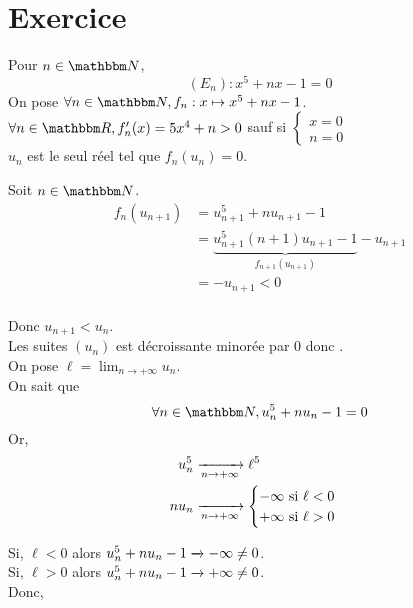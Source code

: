 \part{Exercice}
Pour $n \in \N$, \[
	(E_n): x^{5} + nx - 1 = 0
\] 
On pose $\forall n \in \N, f_n: x \mapsto x^{5} + nx - 1$.\\
$\forall n \in \R, f'_n(x) = 5x^{4}+ n > 0$ sauf si $\begin{cases}
	 x = 0\\
	 n = 0
\end{cases}$ \\

$u_n$ est le seul réel tel que $f_n(u_n) = 0$.

\begin{center}
\end{center}

Soit $n \in \N$.
\begin{align*}
	f_n(u_{n+1}) &= u_{n+1}^{5} + nu_{n+1} -1\\
	&= \underbrace{u_{n+1}^5 (n+1)u_{n+1} - 1}_{f_{n+1}(u_{n+1})} - u_{n+1} \\
	&= -u_{n+1} < 0 \\
\end{align*}

Donc $u_{n+1} < u_n$.\\
Les suites $(u_n)$ est décroissante minorée par $0$ donc .\\

On pose $\ell = \lim_{n\to +\infty} u_n$.\\
On sait que  \[
\forall n \in \N, u_n^5 + nu_n - 1 = 0
\] 
Or,
\begin{align*}
	u_n^5 &\xrightarrow[n \to +\infty]{} \ell^5\\
	nu_n &\xrightarrow[n \to +\infty]{} \begin{cases}
		-\infty \text{ si } \ell < 0\\
		+\infty \text{ si } \ell > 0\\
	\end{cases}
\end{align*}

Si, $\ell < 0$ alors $u_n^5 + nu_n -1 \xrightarrow[]{} -\infty \neq 0$.\\
Si, $\ell > 0$ alors $u_n^5 + nu_n -1 \xrightarrow[]{} +\infty \neq 0$.\\
Donc, \\

